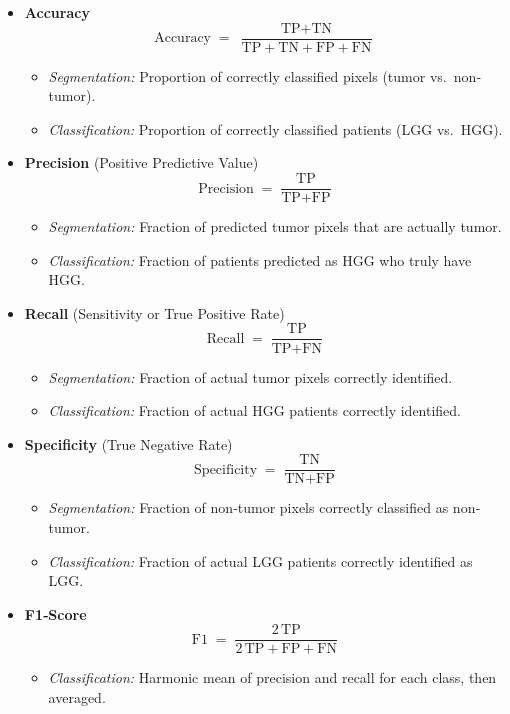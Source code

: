 \begin{itemize}
  \item \textbf{Accuracy}
        \[
          \text{Accuracy} \;=\; \frac{\text{TP} + \text{TN}}{\text{TP} + \text{TN} + \text{FP} + \text{FN}}
        \]
        \begin{itemize}
          \item \emph{Segmentation:} Proportion of correctly classified pixels (tumor vs.\ non‐tumor).
          \item \emph{Classification:} Proportion of correctly classified patients (LGG vs.\ HGG).
        \end{itemize}

  \item \textbf{Precision} (Positive Predictive Value)
        \[
          \text{Precision} \;=\; \frac{\text{TP}}{\text{TP} + \text{FP}}
        \]
        \begin{itemize}
          \item \emph{Segmentation:} Fraction of predicted tumor pixels that are actually tumor.
          \item \emph{Classification:} Fraction of patients predicted as HGG who truly have HGG.
        \end{itemize}

  \item \textbf{Recall} (Sensitivity or True Positive Rate)
        \[
          \text{Recall} \;=\; \frac{\text{TP}}{\text{TP} + \text{FN}}
        \]
        \begin{itemize}
          \item \emph{Segmentation:} Fraction of actual tumor pixels correctly identified.
          \item \emph{Classification:} Fraction of actual HGG patients correctly identified.
        \end{itemize}

  \item \textbf{Specificity} (True Negative Rate)
        \[
          \text{Specificity} \;=\; \frac{\text{TN}}{\text{TN} + \text{FP}}
        \]
        \begin{itemize}
          \item \emph{Segmentation:} Fraction of non‐tumor pixels correctly classified as non‐tumor.
          \item \emph{Classification:} Fraction of actual LGG patients correctly identified as LGG.
        \end{itemize}

  \item \textbf{F1‐Score}
        \[
          \text{F1} \;=\; \frac{2\,\text{TP}}{2\,\text{TP} + \text{FP} + \text{FN}}
        \]
        \begin{itemize}
          \item \emph{Classification:} Harmonic mean of precision and recall for each class, then averaged.
        \end{itemize}


\end{itemize}
